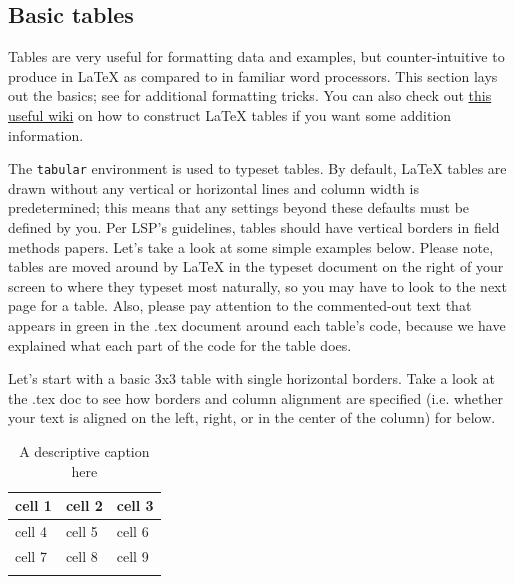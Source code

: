 \documentclass[output=paper,colorlinks,citecolor=brown]{langscibook}
\begin{document}
\subsection{Basic tables} \label{sec:diercks:BasicTables}

Tables are very useful for formatting data and examples, but counter-intuitive to produce in \LaTeX{} as compared to in familiar word processors. This section lays out the basics; see  for additional formatting tricks. You can also check out \href{https://en.wikibooks.org/wiki/LaTeX/Tables}{this useful wiki} on how to construct \LaTeX{} tables if you want some addition information. 

The \texttt{tabular} environment is used to typeset tables. By default, \LaTeX{} tables are drawn without any vertical or horizontal lines and column width is predetermined; this means that any settings beyond these defaults must be defined by you. Per LSP's guidelines, tables should have vertical borders in field methods papers. Let's take a look at some simple examples below. Please note, tables are moved around by \LaTeX{} in the typeset document on the right of your screen to where they typeset most naturally, so you may have to look to the next page for a table. Also, please pay attention to the commented-out text that appears in green in the .tex document around each table's code, because we have explained what each part of the code for the table does.   %


Let's start with a basic 3x3 table with single horizontal borders. Take a look at the .tex doc to see how borders and column alignment are specified (i.e. whether your text is aligned on the left, right, or in the center of the column) for  below. 


\begin{table}

\caption{A descriptive caption here}
\label{tab:diercks:FirstSampleTable}

\begin{tabular}{lll} %
\lsptoprule %
cell 1 & cell 2 & cell 3 \\ 
\hline %
cell 4 & cell 5 & cell 6 \\
\hline %
cell 7 & cell 8 & cell 9 \\
\lspbottomrule %
\end{tabular}

\end{table}
\end{document}
